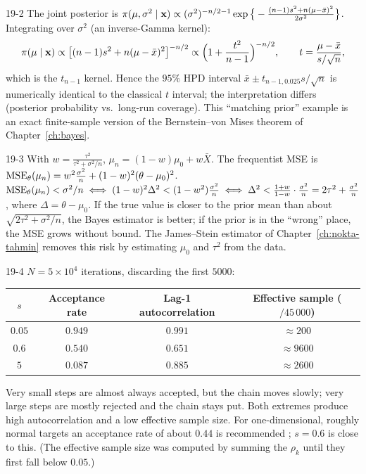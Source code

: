 \begin{solution}{19-2}
The joint posterior is $\pi(\mu,\sigma^2\mid\mathbf{x})\propto(\sigma^2)^{-n/2-1}\exp\big\{-\frac{(n-1)s^2+n(\mu-\bar x)^2}{2\sigma^2}\big\}$. Integrating over $\sigma^2$ (an inverse-Gamma kernel):
\[
\pi(\mu\mid\mathbf{x})\propto\big[(n-1)s^2+n(\mu-\bar x)^2\big]^{-n/2}\propto\Big(1+\frac{t^2}{n-1}\Big)^{-n/2},\qquad t=\frac{\mu-\bar x}{s/\sqrt n},
\]
which is the $t_{n-1}$ kernel. Hence the $95\%$ HPD interval $\bar x\pm t_{n-1,0.025}s/\sqrt n$ is numerically identical to the classical $t$ interval; the interpretation differs (posterior probability vs.\ long-run coverage). This ``matching prior'' example is an exact finite-sample version of the Bernstein--von Mises theorem of Chapter~\ref{ch:bayes}.
\end{solution}

\begin{solution}{19-3}
With $w=\frac{\tau^2}{\tau^2+\sigma^2/n}$, $\mu_n=(1-w)\mu_0+w\bar X$. The frequentist MSE is $\operatorname{MSE}_\theta(\mu_n)=w^2\frac{\sigma^2}{n}+(1-w)^2(\theta-\mu_0)^2$. $\operatorname{MSE}_\theta(\mu_n)<\sigma^2/n\iff(1-w)^2\Delta^2<(1-w^2)\frac{\sigma^2}{n}\iff\Delta^2<\frac{1+w}{1-w}\cdot\frac{\sigma^2}{n}=2\tau^2+\frac{\sigma^2}{n}$, where $\Delta=\theta-\mu_0$. If the true value is closer to the prior mean than about $\sqrt{2\tau^2+\sigma^2/n}$, the Bayes estimator is better; if the prior is in the ``wrong'' place, the MSE grows without bound. The James--Stein estimator of Chapter~\ref{ch:nokta-tahmin} removes this risk by estimating $\mu_0$ and $\tau^2$ from the data.
\end{solution}

\begin{solution}{19-4}
$N=5\times10^4$ iterations, discarding the first $5000$:
\begin{center}\small
\begin{tabular}{@{}cccc@{}}\toprule
$s$ & Acceptance rate & Lag-1 autocorrelation & Effective sample ($/45\,000$)\\\midrule
$0.05$ & $0.949$ & $0.991$ & $\approx200$\\
$0.6$ & $0.540$ & $0.651$ & $\approx9600$\\
$5$ & $0.087$ & $0.885$ & $\approx2600$\\\bottomrule
\end{tabular}
\end{center}
Very small steps are almost always accepted, but the chain moves slowly; very large steps are mostly rejected and the chain stays put. Both extremes produce high autocorrelation and a low effective sample size. For one-dimensional, roughly normal targets an acceptance rate of about $0.44$ is recommended \cite{roberts01}; $s=0.6$ is close to this. (The effective sample size was computed by summing the $\rho_k$ until they first fall below $0.05$.)
\end{solution}

